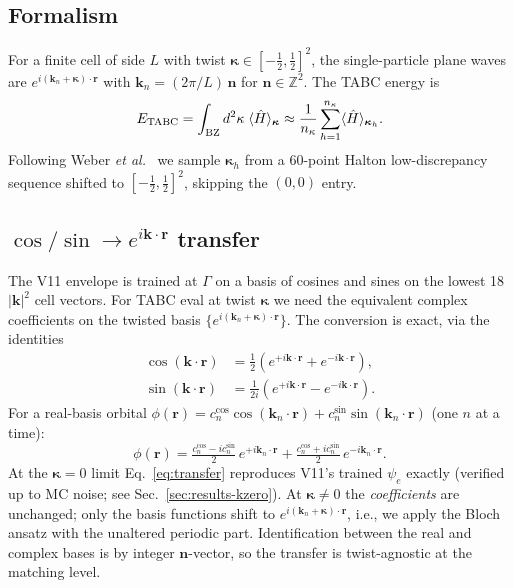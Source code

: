 \documentclass[reprint,amsmath,amssymb,aps,prb,floatfix,nofootinbib]{revtex4-2}
\begin{document}
\subsection{Formalism}
For a finite cell of side $L$ with twist
$\bm\kappa\in [-\tfrac12, \tfrac12]^2$, the single-particle plane
waves are $e^{i(\mathbf k_n + \bm\kappa) \cdot \mathbf{r}}$ with
$\mathbf{k}_n = (2\pi/L)\,\mathbf{n}$ for $\mathbf{n}\in\mathbb{Z}^2$.
The TABC energy is
\begin{equation}
E_{\rm TABC} = \int_{\rm BZ} d^2\kappa \;
               \langle \hat H \rangle_{\bm\kappa}
             \approx \frac{1}{n_\kappa}
               \sum_{h=1}^{n_\kappa}
               \langle \hat H\rangle_{\bm\kappa_h}.
\label{eq:tabc-def}
\end{equation}
Following Weber \emph{et al.}~\cite{Weber2024} we sample
$\bm\kappa_h$ from a 60-point Halton low-discrepancy sequence
\cite{Halton1960} shifted to $[-\tfrac12, \tfrac12]^2$, skipping the
$(0,0)$ entry.

\subsection{$\cos/\sin \to e^{i\mathbf k \cdot \mathbf r}$ transfer}
The V11 envelope is trained at $\Gamma$ on a basis of cosines and
sines on the lowest 18 $|{\mathbf k}|^2$ cell vectors.  For TABC eval
at twist $\bm\kappa$ we need the equivalent complex coefficients on
the twisted basis $\{e^{i (\mathbf k_n + \bm\kappa)\cdot \mathbf{r}}\}$.
The conversion is exact, via the identities
\begin{align}
\cos(\mathbf{k}\cdot \mathbf{r}) &= \tfrac12 \left(
   e^{+i\mathbf k\cdot \mathbf r} + e^{-i\mathbf k\cdot \mathbf r}\right),\\
\sin(\mathbf{k}\cdot \mathbf{r}) &= \tfrac{1}{2i}\left(
   e^{+i\mathbf k\cdot \mathbf r} - e^{-i\mathbf k\cdot \mathbf r}\right).
\end{align}
For a real-basis orbital
$\phi(\mathbf r) = c^{\cos}_n \cos(\mathbf k_n\cdot \mathbf r) + c^{\sin}_n
\sin(\mathbf k_n\cdot \mathbf r)$ (one $n$ at a time):
\begin{equation}
\phi(\mathbf r) =
   \tfrac{c^{\cos}_n - i c^{\sin}_n}{2}\, e^{+i\mathbf k_n\cdot \mathbf r}
 + \tfrac{c^{\cos}_n + i c^{\sin}_n}{2}\, e^{-i\mathbf k_n\cdot \mathbf r}.
\label{eq:transfer}
\end{equation}
At the $\bm\kappa = 0$ limit Eq.~\eqref{eq:transfer} reproduces V11's
trained $\psi_e$ exactly (verified up to MC noise; see
Sec.~\ref{sec:results-kzero}).  At $\bm\kappa \neq 0$ the
\emph{coefficients} are unchanged; only the basis functions shift to
$e^{i(\mathbf k_n + \bm\kappa)\cdot \mathbf{r}}$, i.e., we apply the
Bloch ansatz with the unaltered periodic part.  Identification
between the real and complex bases is by integer $\mathbf{n}$-vector,
so the transfer is twist-agnostic at the matching level.
\end{document}
